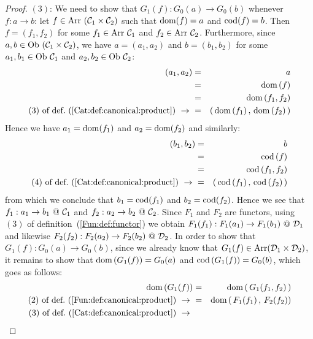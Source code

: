 \begin{proof}
    $(3)$: We need to show that $G_{1}(f):G_{0}(a)\to G_{0}(b)$ whenever 
    $f:a\to b$: let $f\in\mbox{\rm Arr}\ (\mbox{${\cal C}_{1}$}\times\mbox{${\cal C}_{2}$})$ such that $\mbox{\rm dom}(f)=a$ and 
    $\mbox{\rm cod}(f)=b$. Then $f=(f_{1},f_{2})$ for some $f_{1}\in\mbox{\rm Arr}\ \mbox{${\cal C}_{1}$}$ and 
    $f_{2}\in\mbox{\rm Arr}\ \mbox{${\cal C}_{2}$}$. Furthermore, since $a,b\in\mbox{\rm Ob}\ (\mbox{${\cal C}_{1}$}\times\mbox{${\cal C}_{2}$})$, 
    we have $a=(a_{1},a_{2})$ and $b=(b_{1},b_{2})$ for some $a_{1},b_{1}\in\ob\ 
    \Cone$ and $a_{2},b_{2}\in\ob\ \Ctwo$:
        \begin{eqnarray*}(a_{1},a_{2})
            &=&a\\
            &=&\dom\,(f)\\
            &=&\dom\,(f_{1},f_{2})\\
            \mbox{$(3)$ of def.~(\ref{Cat:def:canonical:product})}\ \to\ 
            &=&(\,\dom\,(f_{1})\,,\,\dom\,(f_{2})\,)\\
        \end{eqnarray*}
    Hence we have $a_{1}=\mbox{\rm dom}(f_{1})$ and $a_{2}=\mbox{\rm dom}(f_{2})$ and similarly:
        \begin{eqnarray*}(b_{1},b_{2})
            &=&b\\
            &=&\cod\,(f)\\
            &=&\cod\,(f_{1},f_{2})\\
            \mbox{$(4)$ of def.~(\ref{Cat:def:canonical:product})}\ \to\ 
            &=&(\,\cod\,(f_{1})\,,\,\cod\,(f_{2})\,)\\
        \end{eqnarray*}
    from which we conclude that $b_{1}=\mbox{\rm cod}(f_{1})$ and $b_{2}=\mbox{\rm cod}(f_{2})$. 
    Hence we see that $f_{1}:a_{1}\to b_{1}\ @\ \mbox{${\cal C}_{1}$}$ and $f_{2}:a_{2}\to 
    b_{2}\ @\ \mbox{${\cal C}_{2}$}$. Since $F_{1}$ and $F_{2}$ are functors, using $(3)$ of
    definition~(\ref{Fun:def:functor}) we obtain $F_{1}(f_{1}): F_{1}(a_{1})
    \to F_{1}(b_{1})\ @\ \mbox{${\cal D}_{1}$}$ and likewise $F_{2}(f_{2}): F_{2}(a_{2})
    \to F_{2}(b_{2})\ @\ \mbox{${\cal D}_{2}$}$. In order to show that $G_{1}(f):G_{0}(a)\to 
    G_{0}(b)$, since we already know that $G_{1}(f)\in\mbox{\rm Arr}(
    \mbox{${\cal D}_{1}$}\times\mbox{${\cal D}_{2}$})$, it remains to show that $\mbox{\rm dom}\,(G_{1}(f))=G_{0}(a)$
    and $\mbox{\rm cod}\,(G_{1}(f))=G_{0}(b)$, which goes as follows:
        \begin{eqnarray*}\dom\,(G_{1}(f))
            &=& \dom\,(\,G_{1}(f_{1},f_{2})\,)\\
            \mbox{$(2)$ of def.~(\ref{Fun:def:canonical:product})}\ \to\ 
            &=&\dom\,(\,F_{1}(f_{1})\,,\,F_{2}(f_{2}))\\
            \mbox{$(3)$ of def.~(\ref{Cat:def:canonical:product})}\ \to\ 

\end{eqnarray*}
\end{proof}
